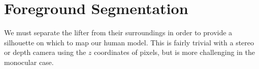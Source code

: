 \section{Foreground Segmentation}

We must separate the lifter from their surroundings in order to provide a silhouette on which to map our human model. This is fairly trivial with a stereo or depth camera using the $z$ coordinates of pixels, but is more challenging in the monocular case.



